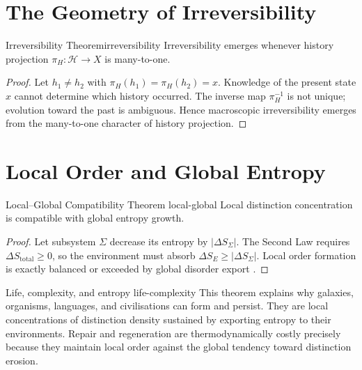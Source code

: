 \documentclass[12pt,twoside,openright]{book}
\newcommand{\hist}{\mathcal{H}}
\begin{document}
\section{The Geometry of Irreversibility}
\label{sec:ch3-irrev}

\begin{theorem}{Irreversibility Theorem}{irreversibility}
  Irreversibility emerges whenever history projection
  $\pi_H: \hist \to X$ is many-to-one.
\end{theorem}

\begin{proof}
  Let $h_1 \ne h_2$ with $\pi_H(h_1) = \pi_H(h_2) = x$.
  Knowledge of the present state $x$ cannot determine
  which history occurred. The inverse map $\pi_H^{-1}$
  is not unique; evolution toward the past is ambiguous.
  Hence macroscopic irreversibility emerges from the
  many-to-one character of history projection.
\end{proof}

\section{Local Order and Global Entropy}
\label{sec:ch3-local}

\begin{theorem}{Local--Global Compatibility Theorem}%
  {local-global}
  Local distinction concentration is compatible with
  global entropy growth.
\end{theorem}

\begin{proof}
  Let subsystem $\Sigma$ decrease its entropy by
  $|\Delta S_\Sigma|$. The Second Law requires
  $\Delta S_\mathrm{total} \ge 0$, so the environment
  must absorb $\Delta S_E \ge |\Delta S_\Sigma|$.
  Local order formation is exactly balanced or exceeded
  by global disorder export \parencite{schrodinger1944}.
\end{proof}

\begin{remark}{Life, complexity, and entropy}%
  {life-complexity}
  This theorem explains why galaxies, organisms,
  languages, and civilisations can form and persist.
  They are local concentrations of distinction density
  sustained by exporting entropy to their environments.
  Repair and regeneration are thermodynamically costly
  precisely because they maintain local order against
  the global tendency toward distinction erosion.
\end{remark}
\end{document}
